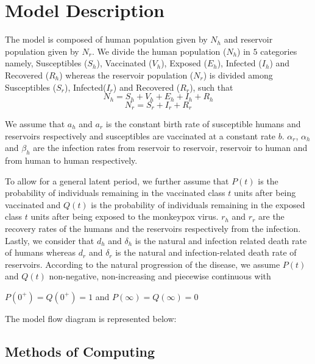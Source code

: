 \newcommand{\package}[1]{\textbf{#1}} %
\newcommand{\cmmd}[1]{\textbackslash\texttt{#1}} %


\chapter{Model Description}

The model is composed of human population given by $N_{h}$ and
reservoir population given by $N_{r}$. We divide the human population ($N_{h}$) in $5$ categories namely, Susceptibles ($S_{h}$), Vaccinated ($V_{h}$), Exposed ($E_{h}$), Infected ($I_{h}$) and Recovered ($R_{h}$) whereas the reservoir population ($N_{r}$) is divided among Susceptibles ($S_{r}$), Infected($I_{r}$) and Recovered ($R_{r}$), such that
\[N_{h} = S_{h} + V_{h} + E_{h} + I_{h} + R_{h}\]
\[N_{r} = S_{r} + I_{r} + R_{r}\]

We assume that $a_{h}$ and $a_{r}$ is the constant birth rate of susceptible humans and reservoirs respectively and susceptibles are vaccinated at a constant rate $b$. $\alpha_{r}$, $\alpha_{h}$ and $\beta_{h}$ are the infection rates from reservoir to reservoir, reservoir to human and from human to human respectively.

To allow for a general latent period, we further assume that $P(t)$ is the probability of individuals remaining in the vaccinated class $t$ units after being vaccinated and $Q(t)$ is the probability of individuals remaining in the exposed class $t$ units after being exposed to the monkeypox virus. $r_{h}$ and $r_{r}$ are the recovery rates of the humans and the reservoirs respectively from the infection. Lastly, we consider that $d_{h}$ and $\delta_{h}$ is the natural and infection related death rate of humans whereas $d_{r}$ and $\delta_{r}$ is the natural and infection-related death rate of reservoirs.
According to the natural progression of the disease, we assume $P(t)$ and $Q(t)$ non-negative, non-increasing and piecewise continuous with 
\begin{center}
$P(0^{+}) = Q(0^{+}) = 1$ and $P(\infty) = Q(\infty) = 0$
\end{center}

The model flow diagram is represented below:



\section{Methods of Computing}
